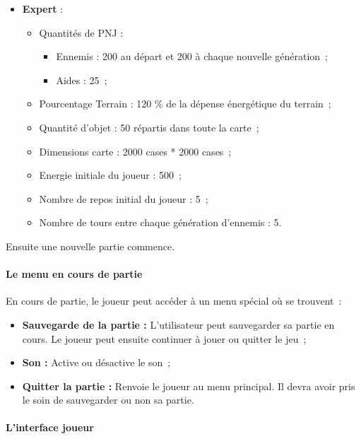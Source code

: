 \documentclass[11pt]{article}
\begin{document}
\begin{itemize}
\begin{itemize}
		\end{itemize}
                     \item \textbf{Expert} :
		\begin{itemize}
			\item Quantités de PNJ :
			
			\begin{itemize}
				\item Ennemis : 200 au départ et 200 à chaque nouvelle génération~;
				\item Aides : 25~;
			\end{itemize}

			\item Pourcentage Terrain : 120 \% de la dépense énergétique du terrain~;
			\item Quantité d'objet : 50 répartis dans toute la carte~;
			\item Dimensions carte : 2000 cases * 2000 cases~;
			\item Energie initiale du joueur : 500~;
			\item Nombre de repos initial du joueur : 5~;
			\item Nombre de tours entre chaque génération d'ennemis : 5.

		\end{itemize}
\end{itemize}

Ensuite une nouvelle partie commence.


\paragraph{Le menu en cours de partie}

En cours de partie, le joueur peut accéder à un menu spécial où se trouvent~:


\begin{itemize}
   \item \textbf{Sauvegarde de la partie : }L'utilisateur peut sauvegarder sa partie en cours. Le joueur peut ensuite continuer à jouer ou quitter le jeu~;
   \item \textbf{Son : }Active ou désactive le son~;
   \item \textbf{Quitter la partie : }Renvoie le joueur au menu principal. Il devra avoir pris le soin de sauvegarder ou non sa partie.  
\end{itemize}


\paragraph{L'interface joueur}
\end{document}
